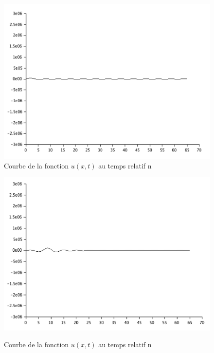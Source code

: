 \documentclass[a4paper,12pt]{report}
\begin{document}
\begin{enumerate}
\begin{figure}[h!]
   \begin{minipage}[b]{0.40\linewidth}
      \includegraphics[scale=0.3]{Piano1.png}\\
	  \caption{Courbe  de la fonction $u(x,t)$ au temps relatif n}
   \end{minipage}\hfill
   \begin{minipage}[b]{0.48\linewidth}   
      \includegraphics[scale=0.3]{Piano2.png}\\
	  \caption{Courbe  de la fonction $u(x,t)$ au temps relatif n}
   \end{minipage}
   \begin{minipage}[b]{0.40\linewidth}

\end{minipage}
\end{figure}
\end{enumerate}
\end{document}
